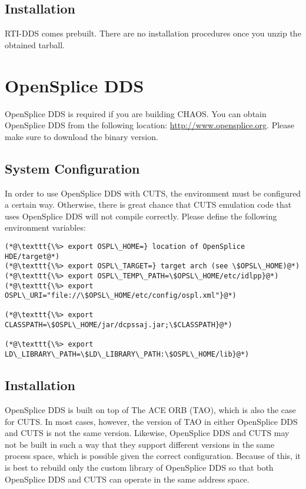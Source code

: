 \subsection{Installation}

RTI-DDS comes prebuilt. There are no installation procedures 
once you unzip the obtained tarball.

\section{OpenSplice DDS}
\label{sec:thirdparty-ospl}

OpenSplice DDS is required if you are building CHAOS. You can obtain 
OpenSplice DDS from the following location: \url{http://www.opensplice.org}.
Please make sure to download the binary version.

\subsection{System Configuration}

In order to use OpenSplice DDS with CUTS, the environment must be configured 
a certain way. Otherwise, there is great chance that CUTS emulation 
code that uses OpenSplice DDS will not compile correctly. Please define the 
following environment variables:
\begin{lstlisting}
(*@\texttt{\%> export OSPL\_HOME=} location of OpenSplice HDE/target@*)
(*@\texttt{\%> export OSPL\_TARGET=} target arch (see \$OPSL\_HOME)@*)
(*@\texttt{\%> export OSPL\_TEMP\_PATH=\$OPSL\_HOME/etc/idlpp}@*)
(*@\texttt{\%> export OSPL\_URI="file://\$OPSL\_HOME/etc/config/ospl.xml"}@*)

(*@\texttt{\%> export CLASSPATH=\$OSPL\_HOME/jar/dcpssaj.jar;\$CLASSPATH}@*)

(*@\texttt{\%> export LD\_LIBRARY\_PATH=\$LD\_LIBRARY\_PATH:\$OSPL\_HOME/lib}@*)
\end{lstlisting}

\subsection{Installation}

OpenSplice DDS is built on top of The ACE ORB (TAO), which is also the
case for CUTS. In most cases, however, the version of TAO in either 
OpenSplice DDS and CUTS is not the same version. Likewise, OpenSplice DDS
and CUTS may not be built in such a way that they support different 
versions in the same process space, which is possible given the correct
configuration. Because of this, it is best to rebuild only the custom
library of OpenSplice DDS so that both OpenSplice DDS and CUTS can operate 
in the same address space. 

